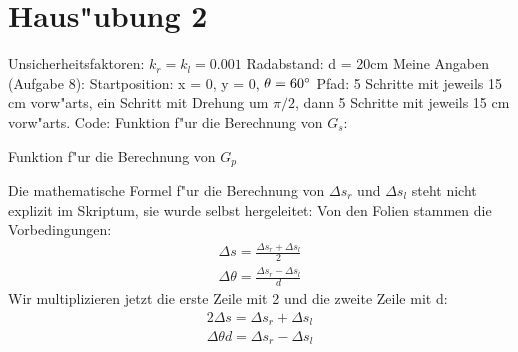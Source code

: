 \documentclass[11pt]{article}
\begin{document}


    \lstset{style=mystyle}


    \section{Haus"ubung 2}\label{sec:h2}
    Unsicherheitsfaktoren: $k_{r} = k_{l} = 0.001$\newline
    Radabstand: d = 20cm\newline
    Meine Angaben (Aufgabe 8):\newline
    Startposition: x = 0, y = 0, $\theta = 60\degree$\newline
    Pfad: 5 Schritte mit jeweils 15 cm vorw"arts, ein Schritt mit Drehung um $\pi/2$, dann 5 Schritte mit jeweils 15 cm vorw"arts.\newline
    Code:\newline
    Funktion f"ur die Berechnung von $G_{s}$:
    
    Funktion f"ur die Berechnung von $G_{p}$
    
    Die mathematische Formel f"ur die Berechnung von $\Delta s_{r}$ und $\Delta s_{l}$ steht nicht explizit im Skriptum, sie wurde selbst hergeleitet:
    Von den Folien stammen die Vorbedingungen:
    \begin{equation}
        \begin{aligned}
            \Delta s = \frac{\Delta s_{r} + \Delta s_{l}}{2} \\
            \Delta \theta = \frac{\Delta s_{r} - \Delta s_{l}}{d}
        \end{aligned}
    \end{equation}
    Wir multiplizieren jetzt die erste Zeile mit 2 und die zweite Zeile mit d:
    \begin{equation}
        \begin{aligned}
            2\Delta s = \Delta s_{r} + \Delta s_{l} \\
            \Delta \theta d = \Delta s_{r} - \Delta s_{l}
        \end{aligned}
    \end{equation}
\end{document}
